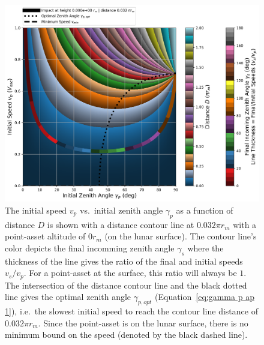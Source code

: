 \documentclass{article}
\begin{document}
\begin{figure}[!htb]
	\centering
	\includegraphics[width=1.00\linewidth]{dist_speed_zenith_plot_001_0.000e+00_0.100.png}
	\caption{The initial speed $v_p$ vs.\ initial zenith angle $\gamma_p$ as a function of distance $D$ is shown with a distance contour line at $0.032\pi r_m$ with a point-asset altitude of $0 r_m$ (on the lunar surface). The contour line's color depicts the final incomming zenith angle $\gamma_s$ where the thickness of the line gives the ratio of the final and initial speeds $v_s/v_p$. For a point-asset at the surface, this ratio will always be $1$. The intersection of the distance contour line and the black dotted line gives the optimal zenith angle $\gamma_{p,opt}$ (Equation~\eqref{eq:gamma p ap 1}), i.e.\ the slowest initial speed to reach the contour line distance of $0.032\pi r_m$. Since the point-asset is on the lunar surface, there is no minimum bound on the speed (denoted by the black dashed line).}\label{fig:dist_speed_zenith_plot_001_0.000e+00_0.100}
\end{figure}
\end{document}
